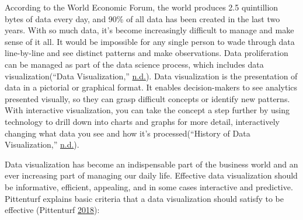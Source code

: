 \documentclass[]{book}
\begin{document}
According to the World Economic Forum, the world produces 2.5 quintillion bytes of data every day, and 90\% of all data has been created in the last two years. With so much data, it's become increasingly difficult to manage and make sense of it all. It would be impossible for any single person to wade through data line-by-line and see distinct patterns and make observations. Data proliferation can be managed as part of the data science process, which includes data visualization(``Data Visualization,'' \protect\hyperlink{ref-data_viz_importance1}{n.d.}). Data visualization is the presentation of data in a pictorial or graphical format. It enables decision-makers to see analytics presented visually, so they can grasp difficult concepts or identify new patterns. With interactive visualization, you can take the concept a step further by using technology to drill down into charts and graphs for more detail, interactively changing what data you see and how it's processed(``History of Data Visualization,'' \protect\hyperlink{ref-data_viz_importance2}{n.d.}).

Data visualization has become an indispensable part of the business world and an ever increasing part of managing our daily life. Effective data visualization should be informative, efficient, appealing, and in some cases interactive and predictive. Pittenturf explains basic criteria that a data visualization should satisfy to be effective (Pittenturf \protect\hyperlink{ref-viz_importance}{2018}):
\end{document}
